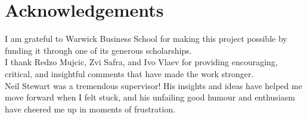 
\chapter*{Acknowledgements}%
\label{cha:acknowledgements}

I am grateful to Warwick Business School for making this project possible by funding it through one of its generous scholarships.\\

\noindent I thank Redzo Mujcic, Zvi Safra, and Ivo Vlaev for providing encouraging, critical, and insightful comments that have made the work stronger.\\

\noindent Neil Stewart was a tremendous supervisor! His insights and ideas have
helped me move forward when I felt stuck, and his unfailing good humour and
enthusiasm have cheered me up in moments of frustration.

